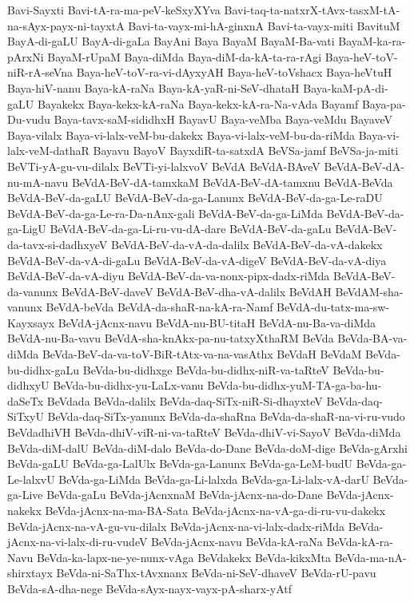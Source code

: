 {Bavi-Sayxti
Bavi-tA-ra-ma-peV-keSxyXYva
Bavi-taq-ta-natxrX-tAvx-tasxM-tA-na-sAyx-payx-ni-tayxtA
Bavi-ta-vayx-mi-hA-ginxnA
Bavi-ta-vayx-miti
BavituM
BayA-di-gaLU
BayA-di-gaLa
BayAni
Baya
BayaM
BayaM-Ba-vati
BayaM-ka-ra-pArxNi
BayaM-rUpaM
Baya-diMda
Baya-diM-da-kA-ta-ra-rAgi
Baya-heV-toV-niR-rA-seVna
Baya-heV-toV-ra-vi-dAyxyAH
Baya-heV-toVshacx
Baya-heVtuH
Baya-hiV-nanu
Baya-kA-raNa
Baya-kA-yaR-ni-SeV-dhataH
Baya-kaM-pA-di-gaLU
Bayakekx
Baya-kekx-kA-raNa
Baya-kekx-kA-ra-Na-vAda
Bayamf
Baya-pa-Du-vudu
Baya-tavx-saM-sididhxH
BayavU
Baya-veMba
Baya-veMdu
BayaveV
Baya-vilalx
Baya-vi-lalx-veM-bu-dakekx
Baya-vi-lalx-veM-bu-da-riMda
Baya-vi-lalx-veM-dathaR
Bayavu
BayoV
BayxdiR-ta-satxdA
BeVSa-jamf
BeVSa-ja-miti
BeVTi-yA-gu-vu-dilalx
BeVTi-yi-lalxvoV
BeVdA
BeVdA-BAveV
BeVdA-BeV-dA-nu-mA-navu
BeVdA-BeV-dA-tamxkaM
BeVdA-BeV-dA-tamxnu
BeVdA-BeVda
BeVdA-BeV-da-gaLU
BeVdA-BeV-da-ga-Lanunx
BeVdA-BeV-da-ga-Le-raDU
BeVdA-BeV-da-ga-Le-ra-Da-nAnx-gali
BeVdA-BeV-da-ga-LiMda
BeVdA-BeV-da-ga-LigU
BeVdA-BeV-da-ga-Li-ru-vu-dA-dare
BeVdA-BeV-da-gaLu
BeVdA-BeV-da-tavx-si-dadhxyeV
BeVdA-BeV-da-vA-da-dalilx
BeVdA-BeV-da-vA-dakekx
BeVdA-BeV-da-vA-di-gaLu
BeVdA-BeV-da-vA-digeV
BeVdA-BeV-da-vA-diya
BeVdA-BeV-da-vA-diyu
BeVdA-BeV-da-va-nonx-pipx-dadx-riMda
BeVdA-BeV-da-vanunx
BeVdA-BeV-daveV
BeVdA-BeV-dha-vA-dalilx
BeVdAH
BeVdAM-sha-vanunx
BeVdA-beVda
BeVdA-da-shaR-na-kA-ra-Namf
BeVdA-du-tatx-ma-sw-Kayxsayx
BeVdA-jAcnx-navu
BeVdA-nu-BU-titaH
BeVdA-nu-Ba-va-diMda
BeVdA-nu-Ba-vavu
BeVdA-sha-knAkx-pa-nu-tatxyXthaRM
BeVda
BeVda-BA-va-diMda
BeVda-BeV-da-va-toV-BiR-tAtx-va-na-vasAthx
BeVdaH
BeVdaM
BeVda-bu-didhx-gaLu
BeVda-bu-didhxge
BeVda-bu-didhx-niR-va-taRteV
BeVda-bu-didhxyU
BeVda-bu-didhx-yu-LaLx-vanu
BeVda-bu-didhx-yuM-TA-ga-ba-hu-daSeTx
BeVdada
BeVda-dalilx
BeVda-daq-SiTx-niR-Si-dhayxteV
BeVda-daq-SiTxyU
BeVda-daq-SiTx-yanunx
BeVda-da-shaRna
BeVda-da-shaR-na-vi-ru-vudo
BeVdadhiVH
BeVda-dhiV-viR-ni-va-taRteV
BeVda-dhiV-vi-SayoV
BeVda-diMda
BeVda-diM-dalU
BeVda-diM-dalo
BeVda-do-Dane
BeVda-doM-dige
BeVda-gArxhi
BeVda-gaLU
BeVda-ga-LalUlx
BeVda-ga-Lanunx
BeVda-ga-LeM-budU
BeVda-ga-Le-lalxvU
BeVda-ga-LiMda
BeVda-ga-Li-lalxda
BeVda-ga-Li-lalx-vA-darU
BeVda-ga-Live
BeVda-gaLu
BeVda-jAcnxnaM
BeVda-jAcnx-na-do-Dane
BeVda-jAcnx-nakekx
BeVda-jAcnx-na-ma-BA-Sata
BeVda-jAcnx-na-vA-ga-di-ru-vu-dakekx
BeVda-jAcnx-na-vA-gu-vu-dilalx
BeVda-jAcnx-na-vi-lalx-dadx-riMda
BeVda-jAcnx-na-vi-lalx-di-ru-vudeV
BeVda-jAcnx-navu
BeVda-kA-raNa
BeVda-kA-ra-Navu
BeVda-ka-lapx-ne-ye-nunx-vAga
BeVdakekx
BeVda-kikxMta
BeVda-ma-nA-shirxtayx
BeVda-ni-SaThx-tAvxnanx
BeVda-ni-SeV-dhaveV
BeVda-rU-pavu
BeVda-sA-dha-nege
BeVda-sAyx-nayx-vayx-pA-sharx-yAtf
}

